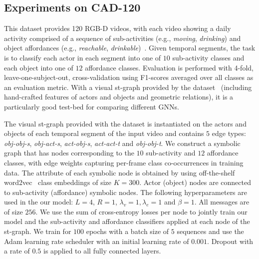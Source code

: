 \documentclass[runningheads]{llncs}
\begin{document}
\subsection{Experiments on CAD-120}
\label{subsec:cad120}
 This dataset provides 120 RGB-D videos, with each video showing a daily activity comprised of a sequence of sub-activities (e.g., \emph{moving}, \emph{drinking}) and object affordances (e.g., \emph{reachable}, \emph{drinkable})~\cite{Koppula:IJRR13}. Given temporal segments, the task is to classify each actor in each segment into one of $10$ sub-activity classes and each object into one of $12$ affordance classes. Evaluation is performed with 4-fold, leave-one-subject-out, cross-validation using F1-scores averaged over all classes as an evaluation metric.  With a visual st-graph provided by the dataset~\cite{Koppula:IJRR13} (including hand-crafted features of actors and objects and geometric relations), it is a particularly good test-bed for comparing different GNNs.

The visual st-graph provided with the dataset is instantiated on the actors and objects of each temporal segment of the input video and contains $5$ edge types: \emph{obj-obj-s}, \emph{obj-act-s}, \emph{act-obj-s}, \emph{act-act-t} and \emph{obj-obj-t}. We construct a symbolic graph that has nodes corresponding to the $10$ sub-activity and $12$ affordance classes, with edge weights capturing per-frame class co-occurrences in training data. The attribute of each symbolic node is obtained by using off-the-shelf word2vec~\cite{Mikolov:NIPS13} class embeddings of size $K=300$. Actor (object) nodes are connected to sub-activity (affordance) symbolic nodes.
The following hyperparameters are used in the our model: $L=4$, $R=1$, $\lambda_v=1,\lambda_e=1$ and $\beta=1$. All messages are of size $256$.
We use the sum of cross-entropy losses per node to jointly train our model and the sub-activity and affordance classifiers applied at each node of the st-graph. We train for $100$ epochs with a batch size of $5$ sequences and use the Adam learning rate scheduler with an initial learning rate of $0.001$. Dropout with a rate of $0.5$ is applied to all fully connected layers.
\end{document}

